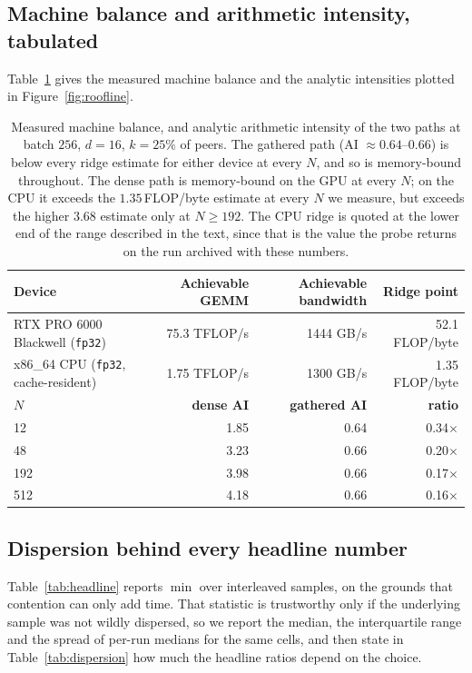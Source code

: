 \subsection{Machine balance and arithmetic intensity, tabulated}
\label{app:roofline}

Table~\ref{tab:roofline} gives the measured machine balance and the analytic
intensities plotted in Figure~\ref{fig:roofline}.

\begin{table}[ht]
\centering
\small
\caption{Measured machine balance, and analytic arithmetic intensity of the two
paths at batch $256$, $d{=}16$, $k = 25\%$ of peers. The gathered path
(AI $\approx 0.64$--$0.66$) is below every ridge estimate for either device at
every $N$, and so is memory-bound throughout. The dense path is memory-bound on
the GPU at every $N$; on the CPU it exceeds the $1.35$\,FLOP/byte estimate at
every $N$ we measure, but exceeds the higher $3.68$ estimate only at
$N \ge 192$. The CPU ridge is quoted at the lower end of the range described in
the text, since that is the value the probe returns on the run archived with
these numbers.}
\label{tab:roofline}
\begin{tabular}{lrrr}
\toprule
\textbf{Device} & \textbf{Achievable GEMM} & \textbf{Achievable bandwidth} & \textbf{Ridge point} \\
\midrule
RTX PRO 6000 Blackwell (\texttt{fp32}) & 75.3 TFLOP/s & 1444 GB/s & 52.1 FLOP/byte \\
x86\_64 CPU (\texttt{fp32}, cache-resident) & 1.75 TFLOP/s & 1300 GB/s & 1.35 FLOP/byte \\
\midrule
\textbf{$N$} & \textbf{dense AI} & \textbf{gathered AI} & \textbf{ratio} \\
\midrule
12  & 1.85 & 0.64 & 0.34$\times$ \\
48  & 3.23 & 0.66 & 0.20$\times$ \\
192 & 3.98 & 0.66 & 0.17$\times$ \\
512 & 4.18 & 0.66 & 0.16$\times$ \\
\bottomrule
\end{tabular}
\end{table}

\subsection{Dispersion behind every headline number}
\label{app:dispersion}

Table~\ref{tab:headline} reports $\min$ over interleaved samples, on the
grounds that contention can only add time. That statistic is trustworthy only
if the underlying sample was not wildly dispersed, so we report the median, the
interquartile range and the spread of per-run medians for the same cells, and
then state in Table~\ref{tab:dispersion} how much the headline ratios depend on
the choice.

